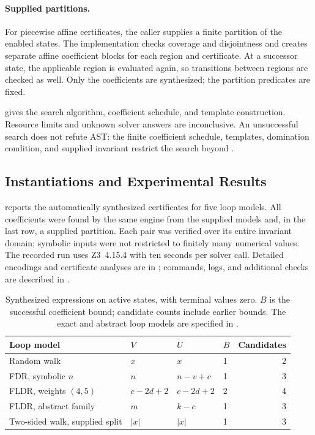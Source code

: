 \paragraph{Supplied partitions.}
\label{sec:synthesis-piecewise}
For piecewise affine certificates, the caller supplies a finite partition
of the enabled states. The implementation checks coverage and disjointness
and creates separate affine coefficient blocks for each region and
certificate. At a successor state, the applicable region is evaluated
again, so transitions between regions are checked as well.
Only the coefficients are synthesized; the partition predicates are fixed.

 gives the search algorithm, coefficient
schedule, and template construction. Resource limits and unknown solver
answers are inconclusive. An unsuccessful search does not refute AST:
the finite coefficient schedule, templates, domination condition, and
supplied invariant restrict the search beyond
.

\subsection{Instantiations and Experimental Results}
\label{sec:synthesis-examples}

 reports the automatically synthesized
certificates for five loop models. All coefficients were found by the
same engine from the supplied models and, in the last row, a supplied
partition. Each pair was verified over its entire invariant domain;
symbolic inputs were not restricted to finitely many numerical values.
The recorded run uses Z3~4.15.4 with ten seconds per solver call.
Detailed encodings and certificate analyses are in
; commands, logs, and additional checks are
described in .

\begin{table}[t]
\centering\small
\setlength{\tabcolsep}{4pt}
\begin{tabular}{@{}llllr@{}}
\toprule
Loop model & $V$ & $U$ & $B$ & Candidates\\
\midrule
Random walk & $x$ & $x$ & 1 & 2\\
FDR, symbolic $n$ & $n$ & $n-v+c$ & 1 & 3\\
FLDR, weights $(4,5)$ & $c-2d+2$ & $c-2d+2$ & 2 & 4\\
FLDR, abstract family & $m$ & $k-c$ & 1 & 3\\
Two-sided walk, supplied split & $|x|$ & $|x|$ & 1 & 3\\
\bottomrule
\end{tabular}
\caption{Synthesized expressions on active states, with terminal values zero.
$B$ is the successful coefficient bound; candidate counts include earlier
bounds. The exact and abstract loop models are specified in
.}
\label{tab:synthesis-results}
\end{table}

